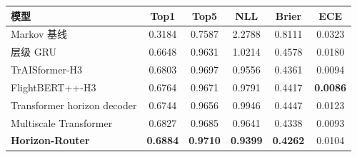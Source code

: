 \begin{tabular}{lccccc}
\toprule
模型 & Top1 & Top5 & NLL & Brier & ECE \\
\midrule
Markov 基线 & 0.3184 & 0.7587 & 2.2788 & 0.8111 & 0.0323 \\
层级 GRU & 0.6648 & 0.9631 & 1.0214 & 0.4578 & 0.0180 \\
TrAISformer-H3 & 0.6803 & 0.9697 & 0.9556 & 0.4361 & 0.0094 \\
FlightBERT++-H3 & 0.6764 & 0.9671 & 0.9791 & 0.4417 & \textbf{0.0086} \\
Transformer horizon decoder & 0.6744 & 0.9656 & 0.9946 & 0.4447 & 0.0123 \\
Multiscale Transformer & 0.6827 & 0.9685 & 0.9641 & 0.4338 & 0.0093 \\
\textbf{Horizon-Router} & \textbf{0.6884} & \textbf{0.9710} & \textbf{0.9399} & \textbf{0.4262} & 0.0104 \\
\bottomrule
\end{tabular}
